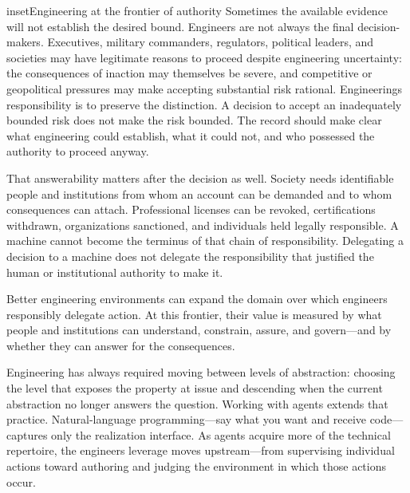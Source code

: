 \begin{bookbox}{inset}{Engineering at the frontier of authority}
Sometimes the available evidence will not establish the desired bound. Engineers are not always the final decision-makers. Executives, military commanders, regulators, political leaders, and societies may have legitimate reasons to proceed despite engineering uncertainty: the consequences of inaction may themselves be severe, and competitive or geopolitical pressures may make accepting substantial risk rational. Engineering\textquotesingle s responsibility is to preserve the distinction. A decision to accept an inadequately bounded risk does not make the risk bounded. The record should make clear what engineering could establish, what it could not, and who possessed the authority to proceed anyway.

That answerability matters after the decision as well. Society needs identifiable people and institutions from whom an account can be demanded and to whom consequences can attach. Professional licenses can be revoked, certifications withdrawn, organizations sanctioned, and individuals held legally responsible. A machine cannot become the terminus of that chain of responsibility. Delegating a decision to a machine does not delegate the responsibility that justified the human or institutional authority to make it.

Better engineering environments can expand the domain over which engineers responsibly delegate action. At this frontier, their value is measured by what people and institutions can understand, constrain, assure, and govern---and by whether they can answer for the consequences.
\end{bookbox}


Engineering has always required moving between levels of abstraction: choosing the level that exposes the property at issue and descending when the current abstraction no longer answers the question. Working with agents extends that practice. Natural-language programming---say what you want and receive code---captures only the realization interface. As agents acquire more of the technical repertoire, the engineer\textquotesingle s leverage moves upstream---from supervising individual actions toward authoring and judging the environment in which those actions occur.


